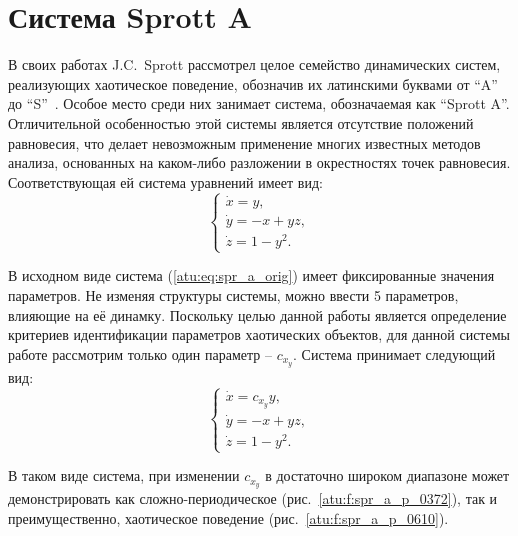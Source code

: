 
\FloatBarrier
\section{Система Sprott A}


В своих работах J.C.~Sprott рассмотрел целое семейство динамических
систем, реализующих хаотическое поведение, обозначив их латинскими буквами
от ``A'' до ``S''~\cite{sprott_212,sprott_strange_attr}. Особое место среди них
занимает система, обозначаемая как ``Sprott A''. Отличительной особенностью
этой системы является отсутствие положений равновесия, что делает
невозможным применение многих известных методов анализа, основанных на
каком-либо разложении в окрестностях точек равновесия. Соответствующая ей
система уравнений имеет вид:
%
\begin{equation}
  \begin{cases}
    \dot{x} =  y, \\
    \dot{y} = -x + yz, \\
    \dot{z} =  1 - y^2.
  \end{cases}
  \label{atu:eq:spr_a_orig}
\end{equation}


В исходном виде система (\ref{atu:eq:spr_a_orig}) имеет фиксированные значения параметров.
Не изменяя структуры системы, можно ввести 5 параметров, влияющие на её динамку.
Поскольку целью данной работы является определение критериев идентификации параметров
хаотических объектов, для данной системы
работе рассмотрим только один параметр -- $c_{x_y} $. Система принимает следующий вид:
%
\begin{equation}
  \begin{cases}
    \dot{x} =  c_{x_y} y, \\
    \dot{y} = -x + yz, \\
    \dot{z} =  1 - y^2.
  \end{cases}
  \label{atu:eq:spr_a}
\end{equation}

В таком виде система, при изменении $c_{x_y} $
в достаточно широком диапазоне может демонстрировать как
сложно-периодическое (рис.~\ref{atu:f:spr_a_p_0372}), так и преимущественно, хаотическое
поведение (рис.~\ref{atu:f:spr_a_p_0610}). 

